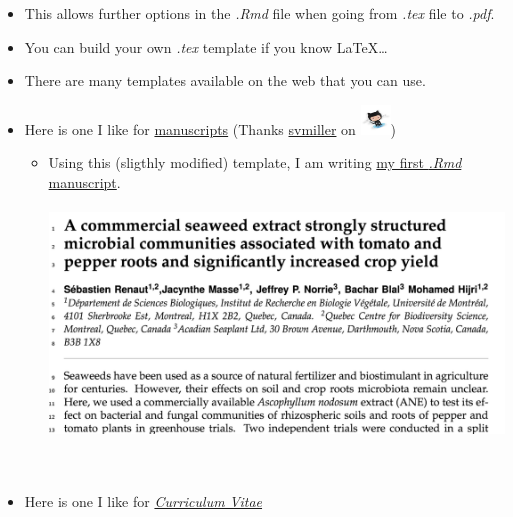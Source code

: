 \documentclass[]{article}
\providecommand{\tightlist}{%
  \setlength{\itemsep}{0pt}\setlength{\parskip}{0pt}}
\begin{document}
\begin{itemize}
\item
  This allows further options in the \emph{.Rmd} file when going from
  \emph{.tex} file to \emph{.pdf}.
\item
  You can build your own \emph{.tex} template if you know LaTeX\ldots{}
\item
  There are many templates available on the web that you can use.
\item
  Here is one I like for
  \href{https://github.com/svmiller/svm-r-markdown-templates/blob/master/svm-latex-ms.tex}{manuscripts}
  (Thanks \href{https://github.com/svmiller}{svmiller} on
  \includegraphics[width=0.3125in,height=\textheight]{../figures/octocat.png})

  \begin{itemize}
  \tightlist
  \item
    Using this (sligthly modified) template, I am writing
    \href{https://github.com/seb951/Acadian_seaplants/blob/master/manuscript_Rmd/Acadian_seaplants_v5.pdf}{my
    first \emph{.Rmd} manuscript}.\\
    \hspace*{0.333em}\\
    \includegraphics[width=5.20833in,height=\textheight]{../figures/acadian.png}\\
    \hspace*{0.333em}\\
    \hspace*{0.333em}\\
  \end{itemize}
\item
  Here is one I like for
  \href{https://github.com/svmiller/svm-r-markdown-templates/blob/master/svm-latex-cv.tex}{\emph{Curriculum
  Vitae}}


\end{itemize}
\end{document}
